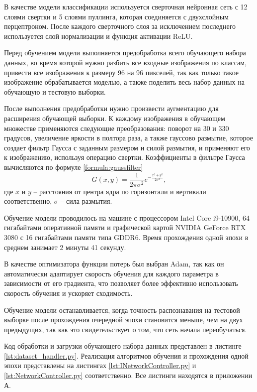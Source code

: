 В качестве модели классификации используется сверточная нейронная сеть с 12 слоями свертки и 5 слоями пуллинга, которая соединяется с двухслойным перцептроном. После каждого сверточного слоя за исключением последнего используется слой нормализации и функция активации ReLU.

Перед обучением модели выполняется предобработка всего обучающего набора данных, во время которой нужно разбить все входные изображения по классам, привести все изображения к размеру 96 на 96 пикселей, так как только такое изображение обрабатывается моделью, а также поделить весь набор данных на обучающую и тестовую выборки.

После выполнения предобработки нужно произвести аугментацию для расширения обучающей выборки. К каждому изображения в обучающем множестве применяются следующие преобразования: поворот на 30 и 330 градусов, увеличение яркости в полтора раза, а также гауссово размытие, которое создает фильтр Гаусса с заданным размером и силой размытия, и применяют его к изображению, используя операцию свертки. Коэффициенты в фильтре Гаусса вычисляются по формуле \ref{formula:gaussfilter}
\begin{equation}\label{formula:gaussfilter}
G(x,y) = \frac{1}{2\pi\sigma^2}e^{-\frac{x^2+y^2}{2\sigma^2}},
\end{equation}
где $x$ и $y$ -- расстояния от центра ядра по горизонтали и вертикали соответственно, $\sigma$ -- сила размытия.

Обучение модели проводилось на машине с процессором Intel Core i9-10900, 64 гигабайтами оперативной памяти и графической картой NVIDIA GeForce RTX 3080 с 16 гигабайтами памяти типа GDDR6. Время прохождения одной эпохи в среднем занимает 2 минуты 41 секунду.

В качестве оптимизатора функции потерь был выбран Adam, так как он автоматически адаптирует скорость обучения для каждого параметра в зависимости от его градиента, что позволяет более эффективно использовать скорость обучения и ускоряет сходимость.

Обучение модели останавливается, когда точность распознавания на тестовой выборке после прохождения очередной эпохи становится меньше, чем на двух предыдущих, так как это свидетельствует о том, что сеть начала переобучаться.

Код обработки и загрузки обучающего набора данных представлен в листинге \ref{lst:dataset_handler.py}. Реализация алгоритмов обучения и прохождения одной эпохи представлены на листингах \ref{lst:INetworkController.py} и \ref{lst:NetworkController.py} соответственно. Все листинги находятся в приложении А.

